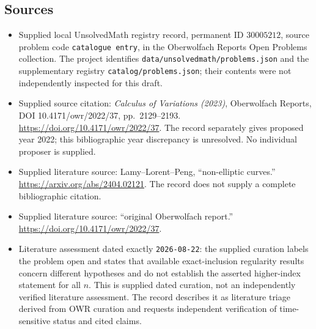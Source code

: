 \documentclass[11pt]{article}
\begin{document}
\subsection{Sources}
\begin{itemize}
\item Supplied local UnsolvedMath registry record, permanent ID \(30005212\), source problem code \texttt{catalogue entry}, in the Oberwolfach Reports Open Problems collection. The project identifies \texttt{data/unsolvedmath/problems.json} and the supplementary registry \texttt{catalog/problems.json}; their contents were not independently inspected for this draft.
\item Supplied source citation: \emph{Calculus of Variations (2023)}, Oberwolfach Reports, DOI 10.4171/owr/2022/37, pp.~2129--2193. \url{https://doi.org/10.4171/owr/2022/37}. The record separately gives proposed year 2022; this bibliographic year discrepancy is unresolved. No individual proposer is supplied.
\item Supplied literature source: Lamy--Lorent--Peng, ``non-elliptic curves.'' \url{https://arxiv.org/abs/2404.02121}. The record does not supply a complete bibliographic citation.
\item Supplied literature source: ``original Oberwolfach report.'' \url{https://doi.org/10.4171/owr/2022/37}.
\item Literature assessment dated exactly \texttt{2026-08-22}: the supplied curation labels the problem open and states that available exact-inclusion regularity results concern different hypotheses and do not establish the asserted higher-index statement for all \(n\). This is supplied dated curation, not an independently verified literature assessment. The record describes it as literature triage derived from OWR curation and requests independent verification of time-sensitive status and cited claims.
\end{itemize}
\end{document}
